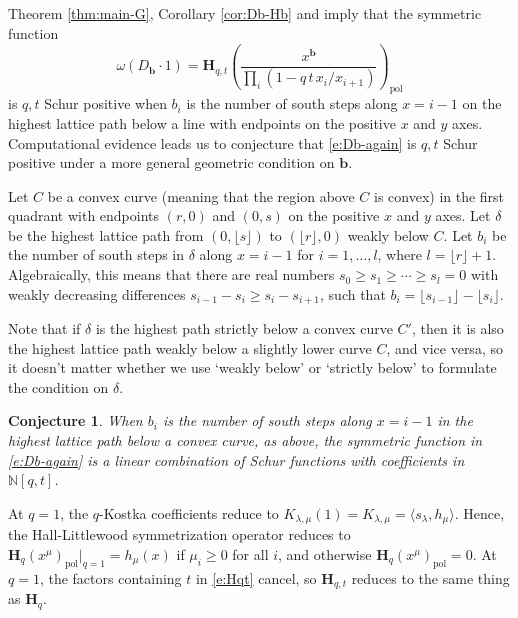 \documentclass[12pt]{amsart}
\newtheorem{conj}[thm]{Conjecture}
\theoremstyle{definition}
\theoremstyle{remark}
\newcommand{\NN}{{\mathbb N}}
\newcommand{\bb}{{\mathbf b}}
\newcommand{\Hbold}{{\mathbf H}}
\DeclareMathOperator{\pol}{pol}
\begin{document}
\subsection{}
\label{ss:positivity}

Theorem \ref{thm:main-G}, Corollary \ref{cor:Db-Hb} and
\cite[Proposition 5.3.1]{HaHaLoReUl05} imply that the
symmetric function
\begin{equation}\label{e:Db-again}
\omega (D_{\bb }\cdot 1) = \Hbold _{q,t}\left(\frac{x^{\bb }}{\prod
_{i} (1-q\, t\, x_{i}/x_{i+1})} \right)_{\pol }
\end{equation}
is $q,t$ Schur positive when $b_{i}$ is the number of south steps
along $x = i-1$ on the highest lattice path below a line with
endpoints on the positive $x$ and $y$ axes.  Computational evidence
leads us to conjecture that \eqref{e:Db-again} is $q,t$ Schur positive
under a more general geometric condition on $\bb $.

Let $C$ be a convex curve (meaning that the region above $C$ is
convex) in the first quadrant with endpoints $(r,0)$ and $(0,s)$ on
the positive $x$ and $y$ axes.  Let $\delta $ be the highest lattice
path from $(0,\lfloor s \rfloor)$ to $(\lfloor r \rfloor,0)$ weakly
below $C$. Let $b_{i}$ be the number of south steps in $\delta $ along
$x = i-1$ for $i = 1,\ldots,l$, where $l = \lfloor r \rfloor + 1$.
Algebraically, this means that there are real numbers $s_{0}\geq
s_{1}\geq \cdots \geq s_{l}=0$ with weakly decreasing differences
$s_{i-1}-s_{i}\geq s_{i}-s_{i+1}$, such that $b_{i} = \lfloor s_{i-1}
\rfloor -\lfloor s_{i} \rfloor$.

Note that if $\delta $ is the highest path strictly below a convex
curve $C'$, then it is also the highest lattice path weakly below a
slightly lower curve $C$, and vice versa, so it doesn't matter whether
we use `weakly below' or `strictly below' to formulate the condition
on $\delta $.


\begin{conj}\label{conj:positivity}
When $b_{i}$ is the number of south steps along $x = i-1$ in the
highest lattice path below a convex curve, as above, the symmetric
function in \eqref{e:Db-again} is a linear combination of Schur
functions with coefficients in $\NN [q,t]$.
\end{conj}

At $q=1$, the $q$-Kostka coefficients reduce to $K_{\lambda ,\mu }(1)
= K_{\lambda ,\mu } = \langle s_{\lambda },h_{\mu } \rangle$.  Hence,
the Hall-Littlewood symmetrization operator reduces to $\Hbold
_{q}(x^{\mu })_{\pol }|_{q=1} = h_{\mu }(x)$ if $\mu _{i}\geq 0$ for
all $i$, and otherwise $\Hbold _{q}(x^{\mu })_{\pol } = 0$.  At $q=1$,
the factors containing $t$ in \eqref{e:Hqt} cancel, so $\Hbold _{q,t}$
reduces to the same thing as $\Hbold _{q}$.
\end{document}
